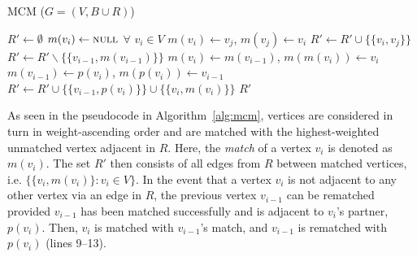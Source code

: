 \documentclass{IEEEtran}
\begin{document}
\begin{algorithm}[H]
\caption{MCM ($G = (V, B \cup R)$)}
\begin{algorithmic}[1]
	\State $R' \gets \emptyset$
	\State $m(v_i) \gets \textsc{null}$ $\forall$ $v_i \in V$
				\State $m(v_i) \gets v_j$, $m(v_j) \gets v_i$
				\State $R' \gets R' \cup \{\{v_i, v_j\}\}$
				\Break
			\EndIf
		\EndFor
			\State $R' \gets R' \backslash \{\{v_{i-1}, m(v_{i-1})\}\}$
			\State $m(v_i) \gets m(v_{i-1})$, $m(m(v_i)) \gets v_i$
			\State $m(v_{i-1}) \gets p(v_i)$, $m(p(v_i)) \gets v_{i-1}$
			\State $R' \gets R' \cup \{\{v_{i-1}, p(v_i)\}\} \cup \{\{v_i, m(v_i)\}\}$
		\EndIf
	\EndFor
	\Return $R'$
\end{algorithmic}
\label{alg:mcm}	
\end{algorithm}

\noindent As seen in the pseudocode in Algorithm~\ref{alg:mcm}, vertices are considered in turn in weight-ascending order and are matched with the highest-weighted unmatched vertex adjacent in $R$. Here, the \emph{match} of a vertex $v_i$ is denoted as $m(v_i)$. The set $R'$ then consists of all edges from $R$ between matched vertices, i.e. $\{\{v_i, m(v_i)\} : v_i \in V \}$. In the event that a vertex $v_i$ is not adjacent to any other vertex via an edge in $R$, the previous vertex $v_{i-1}$ can be rematched provided $v_{i-1}$ has been matched successfully and is adjacent to $v_i$'s partner, $p(v_i)$. Then, $v_i$ is matched with $v_{i-1}$'s match, and $v_{i-1}$ is rematched with $p(v_i)$ (lines 9--13).
\end{document}
